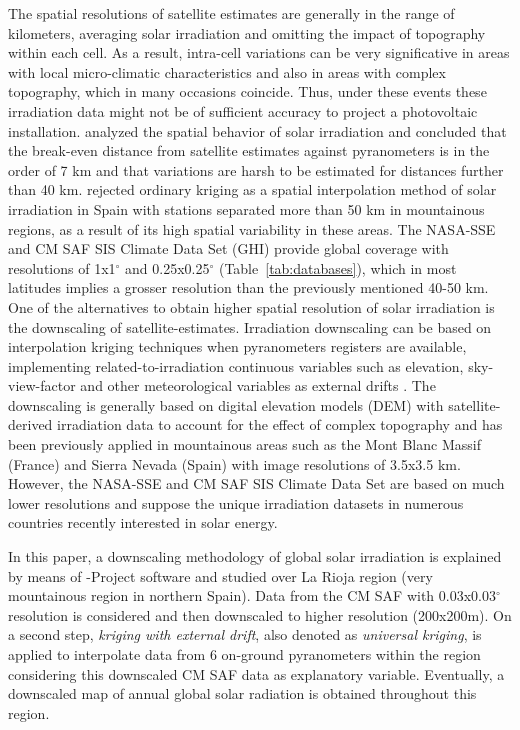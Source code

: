 \documentclass[article]{jss}
\begin{document}
The spatial resolutions of satellite estimates are generally in the
range of kilometers, averaging solar irradiation and omitting the
impact of topography within each cell. As a result, intra-cell
variations can be very significative in areas with local
micro-climatic characteristics and also in areas with complex
topography, which in many occasions coincide. Thus, under these events
these irradiation data might not be of sufficient accuracy to project
a photovoltaic installation. \citep{Perez.Seals.ea1994} analyzed the
spatial behavior of solar irradiation and concluded that the
break-even distance from satellite estimates against pyranometers is
in the order of 7 km and that variations are harsh to be estimated for
distances further than 40
km. \cite{Antonanzas-Torres.Canizares.ea2013} rejected ordinary
kriging as a spatial interpolation method of solar irradiation in
Spain with stations separated more than 50 km in mountainous regions,
as a result of its high spatial variability in these areas. The
NASA-SSE and CM SAF SIS Climate Data Set (GHI) provide global coverage
with resolutions of 1x1$^\circ$ and 0.25x0.25$^\circ$
(Table~\ref{tab:databases}), which in most latitudes implies a grosser
resolution than the previously mentioned 40-50 km.  One of the
alternatives to obtain higher spatial resolution of solar irradiation
is the downscaling of satellite-estimates. Irradiation downscaling can
be based on interpolation kriging techniques when pyranometers
registers are available, implementing related-to-irradiation
continuous variables such as elevation, sky-view-factor and other
meteorological variables as external drifts
\citep{Alsamamra.Ruiz-Arias.ea2009} \citep{Batlles.Bosch.ea2008}. The
downscaling is generally based on digital elevation models (DEM) with
satellite-derived irradiation data to account for the effect of
complex topography and has been previously applied in mountainous
areas such as the Mont Blanc Massif (France) \citep{Corripio2003} and
Sierra Nevada (Spain) \citep{Bosch.Batlles.ea2010} \citep{Ruiz-Arias.Cebecauer.ea2010} with image resolutions of
3.5x3.5 km.  However, the NASA-SSE and CM SAF SIS Climate Data Set
are based on much lower resolutions and suppose the unique irradiation
datasets in numerous countries recently interested in solar energy.

In this paper, a downscaling methodology of global solar
irradiation is explained by means of -Project software
and studied over La Rioja region (very mountainous region in
northern Spain). Data from the CM SAF with 0.03x0.03$^\circ$
resolution is considered and then downscaled to higher resolution
(200x200m). On a second step, \emph{kriging with external
  drift}, also denoted as \emph{universal kriging}, is applied to
interpolate data from 6 on-ground pyranometers within the region
considering this downscaled CM SAF data as explanatory
variable. Eventually, a downscaled map of annual global solar
radiation is obtained throughout this region.
\end{document}
